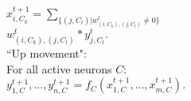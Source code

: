 \documentclass{beamer}
\begin{document}
\begin{frame}
\begin{columns}[T]
\begin{column}{0.3\textwidth}
{{\scriptsize$x_{i,C_k}^{t+1} = \sum_{\{(j,C_l) | w_{(i,C_k), (j,C_l)}^t \neq 0\}}$\\[0.1ex]$w_{(i,C_k), (j,C_l)}^t * y_{j, C_l}^{t}.$}\\[3ex]

``Up movement":\\[0.1ex]  

For all active neurons $C$:\\[1ex]

{\scriptsize $y^{t+1}_{1,C},...,y^{t+1}_{n,C} = f_C (x^{t+1}_{1,C},...,x^{t+1}_{m,C})$.}
}

\end{column}
\end{columns}



\end{frame}
\end{document}
